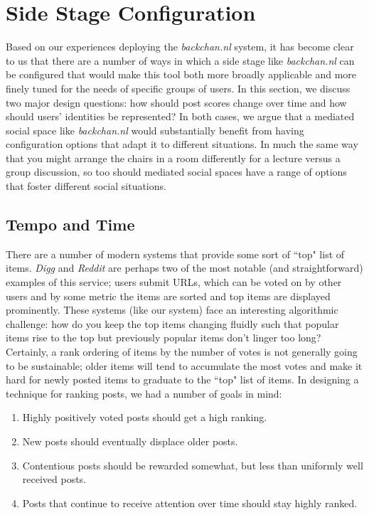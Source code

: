\section{Side Stage Configuration}
Based on our experiences deploying the \emph{backchan.nl} system, it has become clear to us that there are a number of ways in which a side stage like \emph{backchan.nl} can be configured that would make this tool both more broadly applicable and more finely tuned for the needs of specific groups of users. In this section, we discuss two major design questions: how should post scores change over time and how should users' identities be represented? In both cases, we argue that a mediated social space like \emph{backchan.nl} would substantially benefit from having configuration options that adapt it to different situations. In much the same way that you might arrange the chairs in a room differently for a lecture versus a group discussion, so too should mediated social spaces have a range of options that foster different social situations.

\subsection{Tempo and Time}

There are a number of modern systems that provide some sort of ``top" list of items. \emph{Digg} and \emph{Reddit} are perhaps two of the most notable (and straightforward) examples of this service; users submit URLs, which can be voted on by other users and by some metric the items are sorted and top items are displayed prominently. These systems (like our system) face an interesting algorithmic challenge: how do you keep the top items changing fluidly such that popular items rise to the top but previously popular items don't linger too long? Certainly, a rank ordering of items by the number of votes is not generally going to be sustainable; older items will tend to accumulate the most votes and make it hard for newly posted items to graduate to the ``top" list of items. In designing a technique for ranking posts, we had a number of goals in mind:

\begin{enumerate}
\item{Highly positively voted posts should get a high ranking.}
\item{New posts should eventually displace older posts.}
\item{Contentious posts should be rewarded somewhat, but less than uniformly well received posts.}
\item{Posts that continue to receive attention over time should stay highly ranked.}
\end{enumerate}

